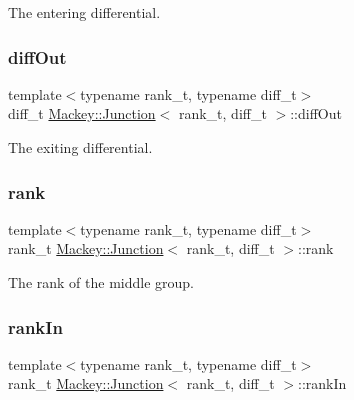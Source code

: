 The entering differential. 

\mbox{\label{classMackey_1_1Junction_a909fce095bc4647a312d6b10480b2d9a}} 
\subsubsection{\texorpdfstring{diff\+Out}{diffOut}}
{\footnotesize\ttfamily template$<$typename rank\+\_\+t, typename diff\+\_\+t$>$ \\
diff\+\_\+t \hyperlink{classMackey_1_1Junction}{Mackey\+::\+Junction}$<$ rank\+\_\+t, diff\+\_\+t $>$\+::diff\+Out}



The exiting differential. 

\mbox{\label{classMackey_1_1Junction_a70d63a0f6ad20b052210ab0009815a9e}} 
\subsubsection{\texorpdfstring{rank}{rank}}
{\footnotesize\ttfamily template$<$typename rank\+\_\+t, typename diff\+\_\+t$>$ \\
rank\+\_\+t \hyperlink{classMackey_1_1Junction}{Mackey\+::\+Junction}$<$ rank\+\_\+t, diff\+\_\+t $>$\+::rank}



The rank of the middle group. 

\mbox{\label{classMackey_1_1Junction_a6174a3bef929f4b5b892d3b7ccb20528}} 
\subsubsection{\texorpdfstring{rank\+In}{rankIn}}
{\footnotesize\ttfamily template$<$typename rank\+\_\+t, typename diff\+\_\+t$>$ \\
rank\+\_\+t \hyperlink{classMackey_1_1Junction}{Mackey\+::\+Junction}$<$ rank\+\_\+t, diff\+\_\+t $>$\+::rank\+In}



